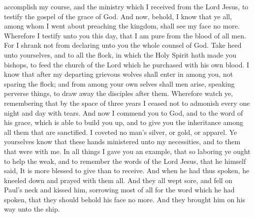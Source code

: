 accomplish my course, and the ministry which I received from the Lord Jesus, to testify the gospel of the grace of God. And now, behold, I know that ye all, among whom I went about preaching the kingdom, shall see my face no more. Wherefore I testify unto you this day, that I am pure from the blood of all men. For I shrank not from declaring unto you the whole counsel of God. Take heed unto yourselves, and to all the flock, in which the Holy Spirit hath made you bishops, to feed the church of the Lord which he purchased with his own blood. I know that after my departing grievous wolves shall enter in among you, not sparing the flock; and from among your own selves shall men arise, speaking perverse things, to draw away the disciples after them. Wherefore watch ye, remembering that by the space of three years I ceased not to admonish every one night and day with tears. And now I commend you to God, and to the word of his grace, which is able to build you up, and to give you the inheritance among all them that are sanctified. I coveted no man’s silver, or gold, or apparel. Ye yourselves know that these hands ministered unto my necessities, and to them that were with me. In all things I gave you an example, that so laboring ye ought to help the weak, and to remember the words of the Lord Jesus, that he himself said, It is more blessed to give than to receive.  And when he had thus spoken, he kneeled down and prayed with them all. And they all wept sore, and fell on Paul’s neck and kissed him, sorrowing most of all for the word which he had spoken, that they should behold his face no more. And they brought him on his way unto the ship. 

